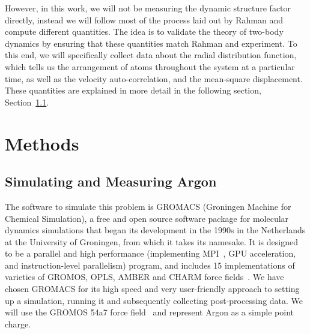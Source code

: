 \documentclass[12pt]{article}
\begin{document}
However, in this work, we will not be measuring the dynamic structure factor directly, instead we will follow most of the process laid out by Rahman and compute different quantities.
%
The idea is to validate the theory of two-body dynamics by ensuring that these quantities match Rahman and experiment.
To this end, we will specifically collect data about the radial distribution function, which tells us the arrangement of atoms throughout the system at a particular time, as well as the velocity auto-correlation, and the mean-square displacement. These quantities are explained in more detail in the following section, Section~\ref{sec:methods}.







\section{Methods}

\subsection{Simulating and Measuring Argon} \label{sec:methods}



The software to simulate this problem is GROMACS (Groningen Machine for Chemical Simulation), a free and open source software package for molecular dynamics simulations that began its development in the 1990s in the Netherlands at the University of Groningen, from which it takes its namesake. It is designed to be a parallel and high performance (implementing MPI~\cite{mpi40}, GPU acceleration, and instruction-level parallelism) program, and includes 15 implementations of varieties of GROMOS, OPLS, AMBER and CHARM force fields~\cite{Spoel2005, Abraham2015}. We have chosen GROMACS for its high speed and very user-friendly approach to setting up a simulation, running it and subsequently collecting post-processing data. We will use the GROMOS 54a7 force field~\cite{Schmid2011} and represent Argon as a simple point charge.
\end{document}
